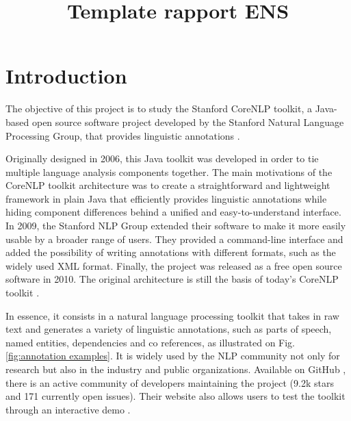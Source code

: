 \documentclass{classeENS}
\title{Template rapport ENS } %
\begin{document}



        
\fairemarges %
\fairepagedegarde %
\tableofcontents 


\newpage

\section{Introduction}\label{sec:introduction} 

The objective of this project is to study the Stanford CoreNLP toolkit, a Java-based open source software project developed by the Stanford Natural Language Processing Group, that provides linguistic annotations \cite{CoreNLP}. 

Originally designed in 2006, this Java toolkit was developed in order to tie multiple language analysis components together. The main motivations of the CoreNLP toolkit architecture was to create a straightforward and lightweight framework in plain Java that efficiently provides linguistic annotations while hiding component differences behind a unified and easy-to-understand interface. In 2009, the Stanford NLP Group extended their software to make it more easily usable by a broader range of users. They provided a command-line interface and added the possibility of writing annotations with different formats, such as the widely used XML format. Finally, the project was released as a free open source software in 2010. The original architecture is still the basis of today’s CoreNLP toolkit \cite{ToolkitPaper}. 

In essence, it consists in a natural language processing toolkit that takes in raw text and generates a variety of linguistic annotations, such as parts of speech, named entities, dependencies and co references, as illustrated on Fig. \ref{fig:annotation examples}. It is widely used by the NLP community not only for research but also in the industry and public organizations. Available on GitHub \cite{CoreNLPGit}, there is an active community of developers maintaining the project (9.2k stars and 171 currently open issues). Their website also allows users to test the toolkit through an interactive demo \cite{CoreNLPDemo}. 
\end{document}
